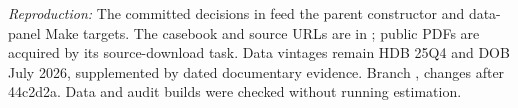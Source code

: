 \textit{Reproduction:} The committed decisions in  feed the parent constructor and data-panel Make targets. The casebook and source URLs are in ; public PDFs are acquired by its source-download task. Data vintages remain HDB 25Q4 and DOB July 2026, supplemented by dated documentary evidence. Branch , changes after 44c2d2a. Data and audit builds were checked without running estimation.
